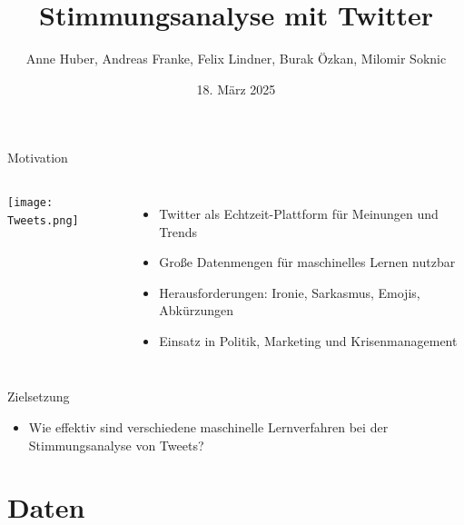 \documentclass[aspectratio=169]{beamer} %
\title{Stimmungsanalyse mit Twitter}
\author[Team Twitter Sentiment]{Anne Huber, Andreas Franke, Felix Lindner, Burak Özkan, Milomir Soknic}
\institute{Projektpraktikum Web Science,\\Artificial Intelligence Group,\\Universität Hagen, Deutschland}
\date{18. März 2025}
\begin{document}
\begin{frame}
  \titlepage
\end{frame}


\begin{frame}{Motivation}
  \begin{columns}
    \centering
    \texttt{[image: Tweets.png]}

    \begin{itemize}
        \item Twitter als Echtzeit-Plattform für Meinungen und Trends
        \item Große Datenmengen für maschinelles Lernen nutzbar
        \item Herausforderungen: Ironie, Sarkasmus, Emojis, Abkürzungen
        \item Einsatz in Politik, Marketing und Krisenmanagement
    \end{itemize}
  \end{columns}
\end{frame}

\begin{frame}{Zielsetzung}
  \Large
  \begin{itemize}
      \item Wie effektiv sind verschiedene maschinelle Lernverfahren bei der Stimmungsanalyse von Tweets?
  \end{itemize}
\end{frame}

\section{Daten}
\end{document}

